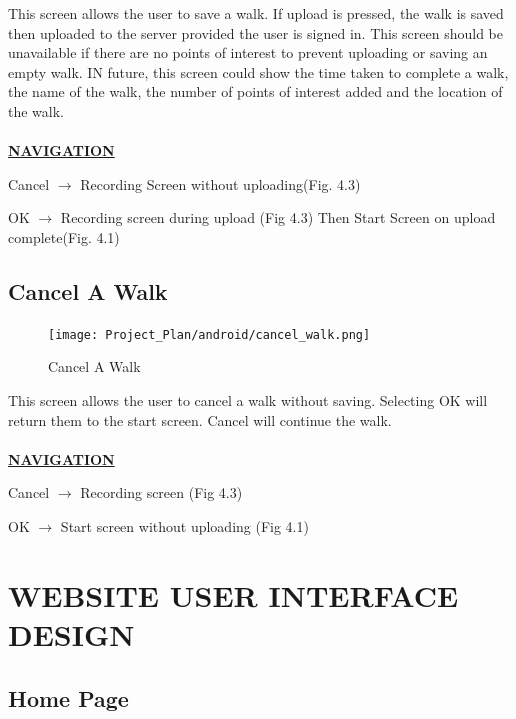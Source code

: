 \documentclass[12pt]{article}
\begin{document}
\par{This screen allows the user to save a walk. If upload is pressed, the walk is saved then uploaded to the server provided the user is signed in. This screen should be unavailable if there are no points of interest to prevent uploading or saving an empty walk. IN future, this screen could show the time taken to complete a walk, the name of the walk, the number of points of interest added and the location of the walk. \\ \\}
\textbf{\uline{NAVIGATION}}
\par{Cancel $\rightarrow$ Recording Screen without uploading(Fig. 4.3)}
\par{OK $\rightarrow$ Recording screen during upload (Fig 4.3) Then Start Screen on upload complete(Fig. 4.1)}
\subsection{Cancel A Walk}
\begin{figure}[htp]
\centering
\texttt{[image: Project\_Plan/android/cancel\_walk.png]}
\caption{Cancel A Walk}
\label{Cancel A Walk}
\end{figure}
\par{This screen allows the user to cancel a walk without saving. Selecting OK will return them to the start screen. Cancel will continue the walk. \\ \\}
\textbf{\uline{NAVIGATION}}
\par{Cancel $\rightarrow$ Recording screen (Fig 4.3)}
\par{OK $\rightarrow$ Start screen without uploading (Fig 4.1)}
\newpage
\section{WEBSITE USER INTERFACE DESIGN}
\subsection{Home Page}
\end{document}
